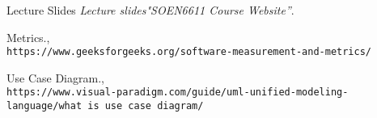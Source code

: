 \documentclass[12pt,letterpaper]{report}
\begin{document}

\begin{thebibliography}{7}

    
    Lecture Slides 
    \textit{Lecture slides"SOEN6611 Course Website”}.     
    
    Metrics.,
    \\\texttt{https://www.geeksforgeeks.org/software-measurement-and-metrics/}
    
    Use Case Diagram.,
    \\\texttt{https://www.visual-paradigm.com/guide/uml-unified-modeling-language/what is use case diagram/}
 
    

    
\end{thebibliography}
\end{document}
